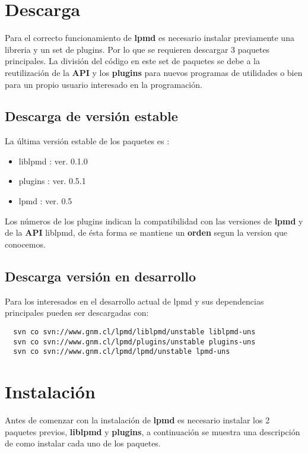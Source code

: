 \documentclass[a4paper,10pt]{scrbook}
\newcommand{\lpmd}{\textbf{lpmd }}
\begin{document}
\section{Descarga}

Para el correcto funcionamiento de \lpmd es necesario instalar previamente una libreria y un set de plugins. Por lo que se requieren descargar 3 paquetes principales. La divisi\'on del c\'odigo en este set de paquetes se debe a la reutilizaci\'on de la \textbf{API} y los \textbf{plugins} para nuevos programas de utilidades o bien para un propio usuario interesado en la programaci\'on.

\subsection{Descarga de versi\'on estable}

La \'ultima versi\'on estable de los paquetes es :

\begin{itemize}
 \item liblpmd : ver. 0.1.0
 \item plugins : ver. 0.5.1
 \item lpmd    : ver. 0.5
\end{itemize}

Los n\'umeros de los plugins indican la compatibilidad con las versiones de \lpmd y de la \textbf{API} liblpmd, de \'esta forma se mantiene un \textbf{orden} segun la version que conocemos.

\subsection{Descarga versi\'on en desarrollo}

Para los interesados en el desarrollo actual de lpmd y sus dependencias principales pueden ser descargadas con:

\begin{center}
 \begin{verbatim}
  svn co svn://www.gnm.cl/lpmd/liblpmd/unstable liblpmd-uns
  svn co svn://www.gnm.cl/lpmd/plugins/unstable plugins-uns
  svn co svn://www.gnm.cl/lpmd/lpmd/unstable lpmd-uns
 \end{verbatim}
\end{center}

\section{Instalaci\'on}
Antes de comenzar con la instalaci\'on de \lpmd es necesario instalar los 2 paquetes previos, \textbf{liblpmd} y \textbf{plugins}, a continuaci\'on se muestra una descripci\'on de como instalar cada uno de los paquetes.
\end{document}
